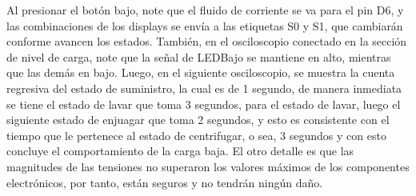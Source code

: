 Al presionar el botón bajo, note que el fluido de corriente se va para el pin D6, y las combinaciones de los displays se envía a las etiquetas S0 y S1, que cambiarán conforme avancen los estados. También, en el osciloscopio conectado en la sección de nivel de carga, note que la señal de LEDBajo se mantiene en alto, mientras que las demás en bajo. Luego, en el siguiente osciloscopio, se muestra la cuenta regresiva del estado de suministro, la cual es de 1 segundo, de manera inmediata se tiene el estado de lavar que toma 3 segundos, para el estado de lavar, luego el siguiente estado de enjuagar que toma 2 segundos, y esto es consistente con el tiempo que le pertenece al estado de centrifugar, o sea, 3 segundos y con esto concluye el comportamiento de la carga baja. El otro detalle es que las magnitudes de las tensiones no superaron los valores máximos de los componentes electrónicos, por tanto, están seguros y no tendrán ningún daño.\par

